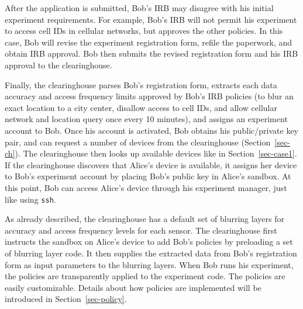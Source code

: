 After the application is submitted, Bob's IRB may disagree with 
his initial experiment requirements. For example, Bob's IRB will not permit
his experiment to access cell IDs in cellular networks, but 
approves the other policies. 
In this case, Bob will revise the experiment registration form, refile the paperwork, 
and obtain IRB approval. Bob then submits the revised  
registration form and his IRB approval to the clearinghouse.

Finally, the clearinghouse
parses Bob's registration form, extracts each data accuracy and access 
frequency limits approved by Bob's IRB policies (to blur an exact location 
to a city center, disallow access to cell IDs, and allow cellular network and 
location query once every 10 minutes), and assigns an experiment 
account to Bob. Once his account is activated, 
Bob obtains his public/private key pair, and can request a number of devices from the 
clearinghouse (Section~\ref{sec-ch}). The clearinghouse then looks up
available devices like in Section~\ref{sec-case1}. If the clearinghouse 
discovers that Alice's device is available, it
assigns her device to Bob's experiment account by placing Bob's
public key in Alice's sandbox. At this point, Bob can access Alice's 
device through his experiment manager, just like using \texttt{ssh}.

As already described, the clearinghouse has a default set of blurring layers 
for accuracy and access frequency levels for each sensor. 
The clearinghouse first instructs 
the sandbox on Alice's device to add Bob's policies by preloading
a set of blurring layer code. It then supplies the extracted data from 
Bob's registration form as input parameters to the blurring layers. 
When Bob runs his experiment, the policies are transparently applied
to the experiment code. 
The policies are easily customizable. Details about
how policies are implemented will be introduced in Section~\ref{sec-policy}.

